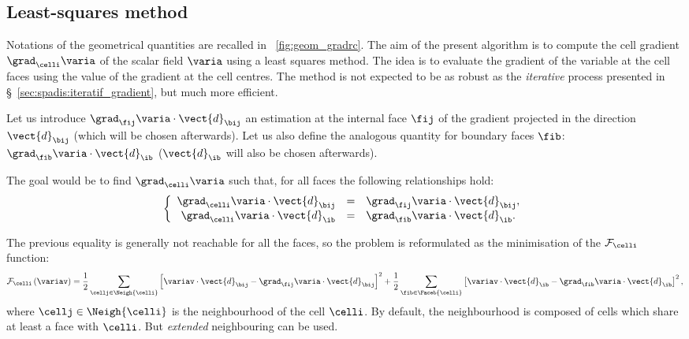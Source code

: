 \subsection{Least-squares method}\label{sec:spadis:least_squares_gradient}
%
Notations of the geometrical quantities are recalled in \figurename~\ref{fig:geom_gradrc}.
The aim of the present algorithm is to compute the cell gradient $\grad_{\celli} \varia $ of the scalar field $\varia$
using a least squares method.
The idea is to evaluate the gradient of the variable at the cell faces using the value of the gradient at the cell centres.
The method is not expected to be as robust as the \emph{iterative} process presented in \S~\ref{sec:spadis:iteratif_gradient},
but much more efficient.

Let us introduce $\grad_{\fij} \varia \cdot \vect{d}_{\bij}$  an estimation at the internal face $\fij$
of the gradient projected in the direction $\vect{d}_{\bij}$ (which will be chosen afterwards).
Let us also define the analogous quantity for boundary faces $\fib$: $\grad_{\fib} \varia \cdot \vect{d}_\ib$
 ($\vect{d}_\ib$ will also be chosen afterwards).

The goal would be to find $\grad_{\celli} \varia $ such that, for all faces
the following relationships hold:
\begin{equation}
\left\{\begin{array}{r c l}
\grad_{\celli} \varia  \cdot \vect{d}_{\bij} &=& \grad_{\fij} \varia \cdot \vect{d}_{\bij} , \\
\grad_{\celli} \varia  \cdot \vect{d}_\ib &=& \grad_{\fib} \varia \cdot \vect{d}_\ib .
\end{array}\right.
\end{equation}

The previous equality is generally not reachable for all the faces, so the
problem is reformulated as the minimisation of the $\mathcal{F}_{\celli}$ function:
%
\begin{equation}\label{eq:spadis:gradmc_function}
\mathcal{F}_{\celli}
\left( \variav \right) =
\dfrac{1}{2}\sum\limits_{\cellj \in \Neigh{\celli}  }\left[
 \variav   \cdot \vect{d}_{\bij}  -  \grad_{\fij} \varia   \cdot \vect{d}_{\bij}
\right]^2+
\dfrac{1}{2}\sum\limits_{ \fib \in \Faceb{\celli}}\left[
 \variav   \cdot \vect{d}_\ib  -  \grad_{\fib} \varia   \cdot \vect{d}_\ib
\right]^2,
\end{equation}
where $\cellj \in \Neigh{\celli} $ is the neighbourhood of the cell $\celli$. By default, the neighbourhood is composed of
cells which share at least a face with $\celli$. But \emph{extended} neighbouring can be used.

